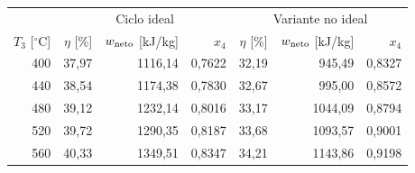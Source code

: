 \begin{tabular}{rrrrrrr}
\toprule
& \multicolumn{3}{c}{Ciclo ideal} & \multicolumn{3}{c}{Variante no ideal}\\
$T_3$ [$^\circ$C] & $\eta$ [\%] & $w_{\rm neto}$ [kJ/kg] & $x_4$ & $\eta$ [\%] & $w_{\rm neto}$ [kJ/kg] & $x_4$\\
\midrule
400 & 37,97 & 1116,14 & 0,7622 & 32,19 & 945,49 & 0,8327 \\
440 & 38,54 & 1174,38 & 0,7830 & 32,67 & 995,00 & 0,8572 \\
480 & 39,12 & 1232,14 & 0,8016 & 33,17 & 1044,09 & 0,8794 \\
520 & 39,72 & 1290,35 & 0,8187 & 33,68 & 1093,57 & 0,9001 \\
560 & 40,33 & 1349,51 & 0,8347 & 34,21 & 1143,86 & 0,9198 \\
\bottomrule
\end{tabular}
